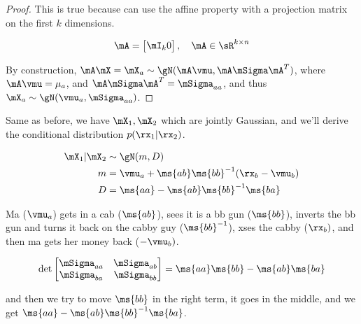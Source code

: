 \begin{tcolorbox}
\begin{proof}
        This is true because can use the affine property with a projection
        matrix on the first $k$ dimensions.

        \begin{equation}
            \mA = \begin{bmatrix} \mI_k 0 \end{bmatrix}, \quad \mA \in \sR^{k \times n}
        \end{equation}

        By construction, $\mA \mX = \mX_a \sim \gN(\mA \vmu, \mA \mSigma
        \mA^T)$, where $\mA \vmu = \mu_a$, and $\mA \mSigma \mA^T =
        \mSigma_{aa}$, and thus $\mX_a \sim \gN(\vmu_a, \mSigma_{aa})$.
    \end{proof}

    \begin{thm}
        Same as before, we have $\mX_1, \mX_2$ which are jointly Gaussian, and
        we'll derive the conditional distribution $p(\rx_1 | \rx_2)$.
    \end{thm}

    \begin{align}
        \mX_1 | \mX_2 & \sim \gN(m, D) \\
        m &= \vmu_a + \ms{ab} \ms{bb}^{-1} ( \rx_b - \vmu_b) \\
        D &= \ms{aa} - \ms{ab} \ms{bb}^{-1} \ms{ba}
    \end{align}

    Ma ($\vmu_a$) gets in a cab ($\ms{ab}$), sees it is a bb gun ($\ms{bb}$),
    inverts the bb gun and turns it back on the cabby guy ($\ms{bb}^{-1}$),
    xses the cabby ($\rx_b)$, and then ma gets her money back ($- \vmu_b)$.

    \begin{equation}
        \det \begin{bmatrix}
            \mSigma_{aa} & \mSigma_{ab} \\
            \mSigma_{ba} & \mSigma_{bb}
        \end{bmatrix} = \ms{aa} \ms{bb} - \ms{ab} \ms{ba}
    \end{equation}

    and then we try to move $\ms{bb}$ in the right term, it goes in the middle,
    and we get $\ms{aa} - \ms{ab} \ms{bb}^{-1} \ms{ba}$.

\end{tcolorbox}
